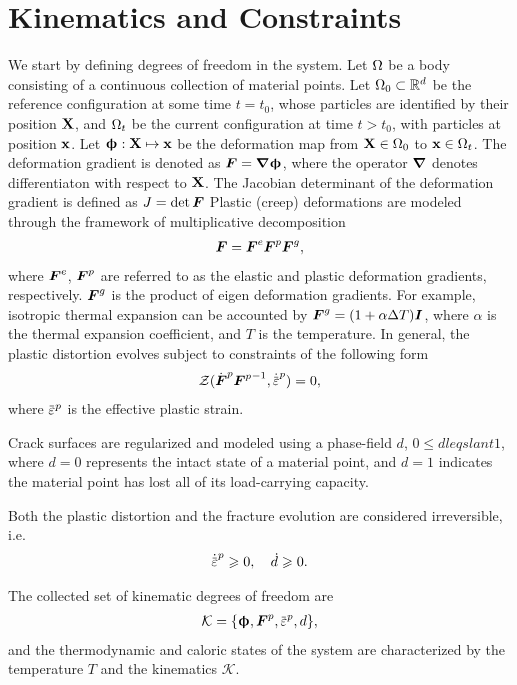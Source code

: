 \section{Kinematics and Constraints}
\label{section: framework/kinematics}

We start by defining degrees of freedom in the system. Let $\Omega$ be a body consisting of a continuous collection of material points. Let $\Omega_0 \subset \mathbb{R}^d$ be the reference configuration at some time $t = t_0$, whose particles are identified by their position $\textbf{X}$, and $\Omega_t$ be the current configuration at time $t > t_0$, with particles at position $\textbf{x}$. Let $\boldsymbol{\upphi}: \textbf{X} \mapsto \textbf{x}$ be the deformation map from $\textbf{X} \in \Omega_0$ to $\textbf{x} \in \Omega_t$.
The deformation gradient is denoted as $\boldsymbol{F} = \boldsymbol{\nabla} \boldsymbol{\upphi}$, where the operator $\boldsymbol{\nabla}$ denotes differentiaton with respect to $\textbf{X}$. The Jacobian determinant of the deformation gradient is defined as $J = \det\boldsymbol{F}$ Plastic (creep) deformations are modeled through the framework of multiplicative decomposition
\begin{align}
  \boldsymbol{F} = \boldsymbol{F}^e \boldsymbol{F}^p \boldsymbol{F}^g,
\end{align}
where $\boldsymbol{F}^e$, $\boldsymbol{F}^p$ are referred to as the elastic and plastic deformation gradients, respectively. $\boldsymbol{F}^g$ is the product of eigen deformation gradients. For example, isotropic thermal expansion can be accounted by $\boldsymbol{F}^g = (1+\alpha \Delta T)\boldsymbol{I}$, where $\alpha$ is the thermal expansion coefficient, and $T$ is the temperature. In general, the plastic distortion evolves subject to constraints of the following form
\begin{align}
  \mathcal{Z}(\dot{\defgrad}^p {\defgrad^p}^{-1}, \epdot) = 0,
\end{align}
where $\ep$ is the effective plastic strain.

Crack surfaces are regularized and modeled using a phase-field $d$, $0 \leqslant d leqslant 1$, where $d = 0$ represents the intact state of a material point, and $d = 1$ indicates the material point has lost all of its load-carrying capacity.

Both the plastic distortion and the fracture evolution are considered irreversible, i.e.
\begin{align}
  \epdot \geqslant 0, \quad \dot{d} \geqslant 0. \label{eq: irreversibility constraints}
\end{align}

The collected set of kinematic degrees of freedom are
\begin{align}
  \mathcal{K} = \{ \bs{\upphi}, \defgrad^p, \ep, d \},
\end{align}
and the thermodynamic and caloric states of the system are characterized by the temperature $T$ and the kinematics $\mathcal{K}$.
